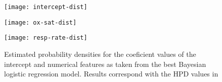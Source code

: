 \begin{figure}[H]
    \centering
    \texttt{[image: intercept-dist]}
\end{figure}

\begin{figure}[H]
    \centering
    \texttt{[image: ox-sat-dist]}
\end{figure}

\begin{figure}[H]
    \centering
    \texttt{[image: resp-rate-dist]}
    \caption[Coefficient probability densities for numerical features]{Estimated probability densities for the coeficient values of the intercept and numerical features as taken from the best Bayesian logistic regression model. Results correspond with the HPD values in }
    \label{fig:other-coef-estimates}
\end{figure}

\clearpage
